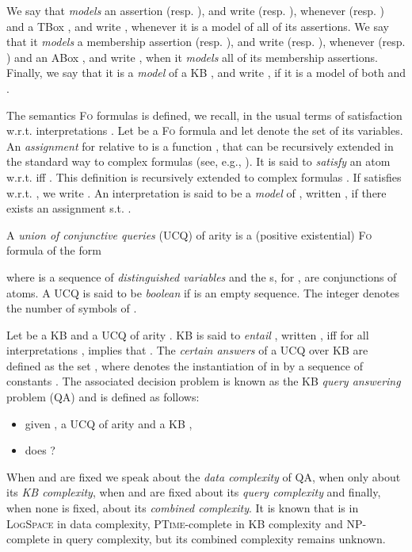 \documentclass[11pt]{llncs}
\newcommand{\logic}[1]{\textsc{#1}\xspace}
\newcommand{\FOL}{\logic{Fo}}
\newcommand{\g}[1]{\logic{#1}}
\newcommand{\LogSpace}{\textsc{LogSpace}\xspace}
\newcommand{\PTime}{\textsc{PTime}\xspace}
\newcommand{\NP}{\textsc{NP}\xspace}
\begin{document}
We say that  {\em models} an assertion  (resp. ),
and write  (resp. ),
whenever  (resp. )
and a TBox
, and write , whenever it is a model of all of its
assertions. We say that it {\em models} a membership assertion
 (resp. ), and write  (resp. ), 
whenever 
(resp. ) 
and an ABox , and write ,
when it {\em models} all of its membership assertions.
Finally, we say that it is a {\em model} of a KB ,
and write ,
if it is a model of both  and .

The semantics \FOL formulas
is defined, we recall, in the usual terms
of satisfaction w.r.t. interpretations .
Let  be a \FOL formula and let
 denote the set of its variables.
An {\em assignment} 
for  relative to  is a
function ,
that can be recursively extended in the standard
way to complex formulas (see, e.g., \cite{CoriLascar}).
It is said to {\em satisfy} an atom  w.r.t. 
iff . This definition
is recursively extended
to complex formulas \cite{CoriLascar}. If  satisfies  w.r.t. ,
we write .
An interpretation  is said to be a {\em model} of
, written , 
if there exists an assignment  s.t. .

A {\em union of conjunctive queries} (UCQ)
of arity 
is a (positive existential) \FOL formula of the form
 
where 
 is a sequence of 
{\em distinguished variables} and
the s, for , are conjunctions of atoms.
A UCQ is said to be {\em boolean} if 
is an empty sequence. The integer 
denotes the number of symbols of .


Let  be a KB and  a UCQ of arity . 
KB  is said to {\em entail}
, written 
,
iff for all interpretations , 
implies that .
The {\em certain answers} of a UCQ  over KB 
 are defined as the set
, where
 denotes the instantiation of  in 
by a sequence of constants . The associated decision
problem is known as the KB {\em query answering} problem (\g{QA}) 
and is
defined as follows:
\begin{itemize}
\item given , a UCQ  of arity  and a
KB ,
\item does ?
\end{itemize}

When  and  are fixed we speak about the 
{\em data complexity} of \g{QA}, when only  about its {\em KB complexity}, 
when  and  are fixed about its {\em query complexity}
and finally, when none is fixed, about its {\em combined complexity}.
It is known \cite{Calvanese2007C} that  is
in \LogSpace in data complexity, \PTime-complete in KB complexity and
\NP-complete in query complexity, but its combined complexity remains unknown.
\end{document}
